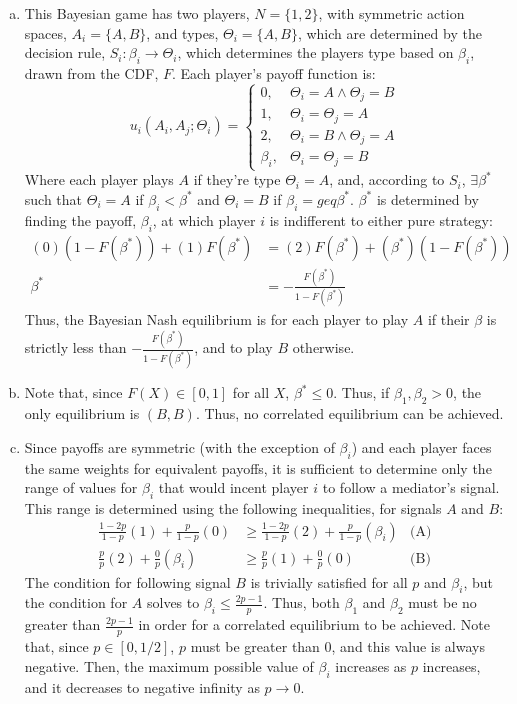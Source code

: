 \documentclass{article}
\begin{document}
\begin{enumerate}[(a)]
	
	\item This Bayesian game has two players, ${N=\{1,2\}}$, with symmetric action spaces, ${A_i=\{A,B\}}$, and types, ${\Theta_i=\{A,B\}}$, which are determined by the decision rule, ${S_i:\beta_i\rightarrow\Theta_i}$, which determines the players type based on $\beta_i$, drawn from the CDF, $F$. Each player's payoff function is:
		\[
			u_i(A_i,A_j;\Theta_i) = 	\begin{cases}
										0, 			& \Theta_i = A\land \Theta_j = B	\\
										1, 			& \Theta_i = \Theta_j = A 			\\
										2, 			& \Theta_i = B\land \Theta_j = A	\\
										\beta_i, 	& \Theta_i = \Theta_j = B
									\end{cases}
		\]
		Where each player plays $A$ if they're type $\Theta_i=A$, and, according to $S_i$, $\exists\beta^*$ such that ${\Theta_i=A}$ if ${\beta_i<\beta^*}$ and ${\Theta_i=B}$ if ${\beta_i=geq\beta^*}$. $\beta^*$ is determined by finding the payoff, $\beta_i$, at which player $i$ is indifferent to either pure strategy:
			\begin{align*}
				(0)(1-F(\beta^*)) + (1)F(\beta^*) &= (2)F(\beta^*) + (\beta^*)(1-F(\beta^*))	\\
					\beta^* &= -\frac{F(\beta^*)}{1-F(\beta^*)}
			\end{align*}
		Thus, the Bayesian Nash equilibrium is for each player to play $A$ if their $\beta$ is strictly less than $-\frac{F(\beta^*)}{1-F(\beta^*)}$, and to play $B$ otherwise.
	
	
	\item Note that, since ${F(X)\in[0,1]}$ for all $X$, $\beta^*\leq0$. Thus, if ${\beta_1,\beta_2>0}$, the only equilibrium is $(B,B)$. Thus, no correlated equilibrium can be achieved.
	
	
	\item Since payoffs are symmetric (with the exception of $\beta_i$) and each player faces the same weights for equivalent payoffs, it is sufficient to determine only the range of values for $\beta_i$ that would incent player $i$ to follow a mediator's signal. This range is determined using the following inequalities, for signals $A$ and $B$:
		\begin{align*}
			\frac{1-2p}{1-p}(1) + \frac{p}{1-p}(0) &\geq \frac{1-2p}{1-p}(2) + \frac{p}{1-p}(\beta_i) &\text{(A)}	\\
			\frac{p}{p}(2) + \frac{0}{p}(\beta_i) &\geq \frac{p}{p}(1) + \frac{0}{p}(0) &\text{(B)}
		\end{align*}
		The condition for following signal $B$ is trivially satisfied for all $p$ and $\beta_i$, but the condition for $A$ solves to ${\beta_i\leq\frac{2p-1}{p}}$. Thus, both $\beta_1$ and $\beta_2$ must be no greater than $\frac{2p-1}{p}$ in order for a correlated equilibrium to be achieved. Note that, since ${p\in[0,1/2]}$, $p$ must be greater than 0, and this value is always negative. Then, the maximum possible value of $\beta_i$ increases as $p$ increases, and it decreases to negative infinity as $p\rightarrow 0$.
	
\end{enumerate}
\end{document}
